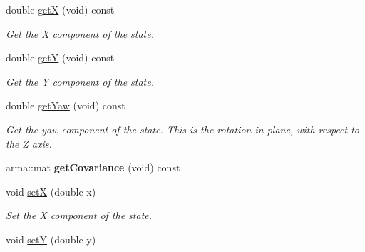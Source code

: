 \begin{DoxyCompactItemize}
\item 
\hypertarget{class_s_e2_belief_space_1_1_state_type_a387c4a054850471f2e6eb53b354a5b06}{double \hyperlink{class_s_e2_belief_space_1_1_state_type_a387c4a054850471f2e6eb53b354a5b06}{get\-X} (void) const }\label{class_s_e2_belief_space_1_1_state_type_a387c4a054850471f2e6eb53b354a5b06}

\begin{DoxyCompactList}\small\item\em \-Get the \-X component of the state. \end{DoxyCompactList}\item 
\hypertarget{class_s_e2_belief_space_1_1_state_type_a8e32b9c1c8da1bb687d33801d5805fdd}{double \hyperlink{class_s_e2_belief_space_1_1_state_type_a8e32b9c1c8da1bb687d33801d5805fdd}{get\-Y} (void) const }\label{class_s_e2_belief_space_1_1_state_type_a8e32b9c1c8da1bb687d33801d5805fdd}

\begin{DoxyCompactList}\small\item\em \-Get the \-Y component of the state. \end{DoxyCompactList}\item 
\hypertarget{class_s_e2_belief_space_1_1_state_type_a1ae660667f7db3285e341570f3ee2da0}{double \hyperlink{class_s_e2_belief_space_1_1_state_type_a1ae660667f7db3285e341570f3ee2da0}{get\-Yaw} (void) const }\label{class_s_e2_belief_space_1_1_state_type_a1ae660667f7db3285e341570f3ee2da0}

\begin{DoxyCompactList}\small\item\em \-Get the yaw component of the state. \-This is the rotation in plane, with respect to the \-Z axis. \end{DoxyCompactList}\item 
\hypertarget{class_s_e2_belief_space_1_1_state_type_a604a4895fd3b2bdcbfb815e8d49b399c}{arma\-::mat {\bfseries get\-Covariance} (void) const }\label{class_s_e2_belief_space_1_1_state_type_a604a4895fd3b2bdcbfb815e8d49b399c}

\item 
\hypertarget{class_s_e2_belief_space_1_1_state_type_aafa60b4810c40a106fb5db62fde17026}{void \hyperlink{class_s_e2_belief_space_1_1_state_type_aafa60b4810c40a106fb5db62fde17026}{set\-X} (double x)}\label{class_s_e2_belief_space_1_1_state_type_aafa60b4810c40a106fb5db62fde17026}

\begin{DoxyCompactList}\small\item\em \-Set the \-X component of the state. \end{DoxyCompactList}\item 
\hypertarget{class_s_e2_belief_space_1_1_state_type_a26d653e2790a61a3ba36158e3afeb930}{void \hyperlink{class_s_e2_belief_space_1_1_state_type_a26d653e2790a61a3ba36158e3afeb930}{set\-Y} (double y)}\label{class_s_e2_belief_space_1_1_state_type_a26d653e2790a61a3ba36158e3afeb930}


\end{DoxyCompactItemize}

